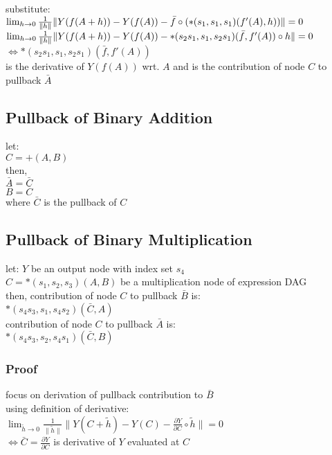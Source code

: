 \documentclass[8pt]{extarticle}
\begin{document}
\begin{multicols*}{2}
  substitute:\\
  $\lim_{h \rightarrow 0} \frac{1}{\|h\|} \|Y(f(A+h)) - Y(f(A))\\ - \bar{f} \circ (*(s_1, s_1, s_1)(f'(A), h))\| = 0$\\
  $\lim_{h \rightarrow 0} \frac{1}{\|h\|} \|Y(f(A+h)) - Y(f(A))\\ - *(s_2 s_1, s_1, s_2 s_1)(\bar{f}, f'(A)) \circ h\| = 0$\\
  $\iff *(s_2 s_1, s_1, s_2 s_1)(\bar{f}, f'(A))$\\
  is the derivative of $Y(f(A))$ wrt. $A$ and is the contribution of node $C$ to pullback $\bar{A}$\\
  
  \vfill\null
  \columnbreak
  
  \subsection{Pullback of Binary Addition}
  let:\\
  $C = +(A,B)$\\
  then,\\
  $\bar{A} = \bar{C}$\\
  $\bar{B} = \bar{C}$\\
  where $\bar{C}$ is the pullback of $C$

  \vfill\null
  \columnbreak
  
  \subsection{Pullback of Binary Multiplication}
  let:
  $Y$ be an output node with index set $s_4$\\
  $C = *(s_1, s_2, s_3)(A, B)$ be a multiplication node of expression DAG\\
  then, contribution of node $C$ to pullback $\bar{B}$ is:\\
  $*(s_4 s_3, s_1, s_4 s_2)(\bar{C}, A)$\\
  contribution of node $C$ to pullback $\bar{A}$ is:\\
  $*(s_4 s_3, s_2, s_4 s_1)(\bar{C}, B)$

  \subsubsection{Proof}
  focus on derivation of pullback contribution to $\bar{B}$\\
  using definition of derivative:\\
  $\lim_{\tilde{h} \rightarrow 0} \frac{1}{\|\tilde{h}\|} \|Y(C+\tilde{h}) - Y(C) - \frac{\partial Y}{\partial C} \circ \tilde{h}\| = 0$\\
  $\iff \bar{C} = \frac{\partial Y}{\partial C}$ is derivative of $Y$ evaluated at $C$\\


\end{multicols*}
\end{document}
